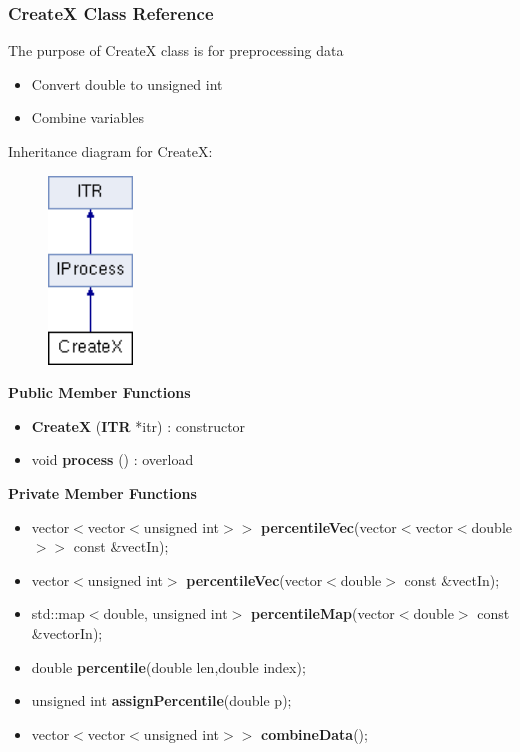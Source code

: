 \documentclass{article}
\begin{document}
\subsubsection{CreateX  Class Reference}
The purpose of CreateX class is for preprocessing data
\begin{itemize}
\item Convert double to unsigned int
\item Combine variables
\end{itemize}

Inheritance diagram for CreateX:
\begin{figure}[H]
\centering
\includegraphics[width=0.2\textwidth]{class_create_x.png}
\end{figure}

\textbf{Public Member Functions}
\begin{itemize}
\item \textbf{CreateX} (\textbf{ITR} *itr) : constructor
\item void \textbf{process} () : overload
\end{itemize}

\textbf{Private Member Functions}
\begin{itemize}
\item vector$<$vector$<$unsigned int$>>$ \textbf{percentileVec}(vector$<$vector$<$double$>>$ const \&vectIn);
\item vector$<$unsigned int$>$ \textbf{percentileVec}(vector$<$double$>$ const \&vectIn);
\item std::map$<$double, unsigned int$>$ \textbf{percentileMap}(vector$<$double$>$ const \&vectorIn);
\item double \textbf{percentile}(double len,double index);
\item unsigned int \textbf{assignPercentile}(double p);
\item vector$<$vector$<$unsigned int$>>$ \textbf{combineData}();
\end{itemize}
\end{document}
